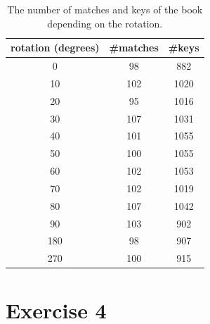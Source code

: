 \documentclass[11pt,a4paper]{article}
\begin{document}
\begin{table}[h]
    \centering
    \begin{tabular}{c|c|c}
        rotation (degrees) & \#matches & \#keys \\
        \hline
        0 & 98 & 882 \\
        \hline
        10 & 102 & 1020 \\
        \hline
        20 & 95 & 1016 \\
        \hline
        30 & 107 & 1031 \\
        \hline
        40 & 101 & 1055 \\
        \hline
        50 & 100 & 1055 \\
        \hline
        60 & 102 & 1053 \\
        \hline
        70 & 102 & 1019 \\
        \hline
        80 & 107 & 1042 \\
        \hline
        90 & 103 & 902 \\
        \hline
        180 & 98 & 907 \\
        \hline
        270 & 100 & 915 \\
    \end{tabular}
    \caption{The number of matches and keys of the book depending on the rotation.}
    \label{tab:bookrotation}
\end{table}



\section*{Exercise 4}
\end{document}

